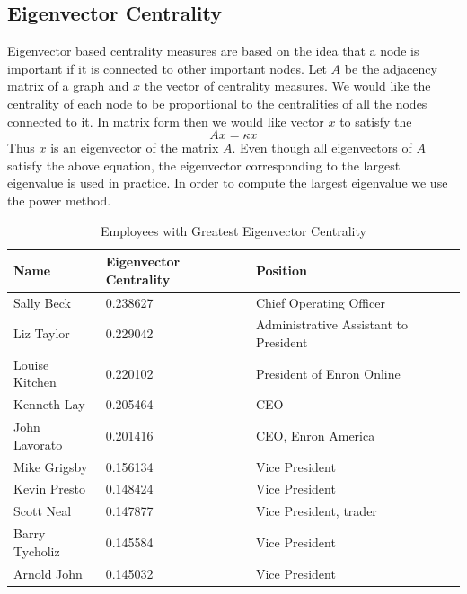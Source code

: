\documentclass[12pt]{article}
\begin{document}
	\subsection{Eigenvector Centrality} Eigenvector based centrality measures are based on the idea that a node is important if it is connected to other important nodes. Let $A$ be the adjacency matrix of a graph and $x$ the vector of centrality measures. We would like the centrality of each node to be proportional to the centralities of all the nodes connected to it. In matrix form then we would like vector $x$ to satisfy the 
		\begin{equation}
			A x = \kappa x
		\end{equation}
		Thus $x$ is an eigenvector of the matrix $A$. Even though all eigenvectors of $A$ satisfy the above equation, the eigenvector corresponding to the largest eigenvalue is used in practice. In order to compute the largest eigenvalue we use the power method.
		
        \begin{table}[h]
        \caption{Employees with Greatest Eigenvector Centrality}
        \centering
        \begin{tabular}{|l|l|l|}
        \hline
        \textbf{Name }          & \textbf{Eigenvector Centrality} & \textbf{Position}                              \\ \hline
        Sally Beck     & 0.238627               & Chief Operating Officer               \\ \hline
        Liz Taylor     & 0.229042               & Administrative Assistant to President \\ \hline
        Louise Kitchen & 0.220102               & President of Enron Online             \\ \hline
        Kenneth Lay    & 0.205464               & CEO                                   \\ \hline
        John Lavorato  & 0.201416               & CEO, Enron America                    \\ \hline
        Mike Grigsby   & 0.156134               & Vice President                        \\ \hline
        Kevin Presto   & 0.148424               & Vice President                        \\ \hline
        Scott Neal     & 0.147877               & Vice President, trader                \\ \hline
        Barry Tycholiz & 0.145584               & Vice President                        \\ \hline
        Arnold John    & 0.145032               & Vice President                        \\ \hline
        \end{tabular}
        \end{table}
	
\end{document}
